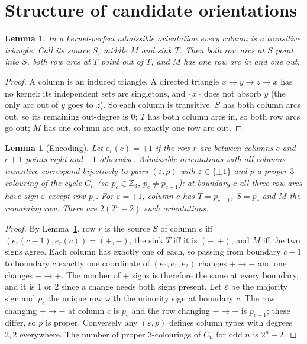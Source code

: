 \documentclass[11pt]{article}
\theoremstyle{plain}
\newtheorem{lemma}[theorem]{Lemma}
\theoremstyle{definition}
\theoremstyle{remark}
\begin{document}
\section{Structure of candidate orientations}

\begin{lemma}\label{lem:transitive}
In a kernel-perfect admissible orientation every column is a transitive triangle. Call
its source $S$, middle $M$ and sink $T$. Then both row arcs at $S$ point into $S$, both row
arcs at $T$ point out of $T$, and $M$ has one row arc in and one out.
\end{lemma}
\begin{proof}
A column is an induced triangle. A directed triangle $x\to y\to z\to x$ has no kernel:
its independent sets are singletons, and $\{x\}$ does not absorb $y$ (the only arc out
of $y$ goes to $z$). So each column is transitive. $S$ has both column arcs out, so its
remaining out-degree is $0$; $T$ has both column arcs in, so both row arcs go out; $M$
has one column arc out, so exactly one row arc out.
\end{proof}

\begin{lemma}[Encoding]\label{lem:encoding}
Let $e_r(c)=+1$ if the row-$r$ arc between columns $c$ and $c+1$ points right and $-1$
otherwise. Admissible orientations with all columns transitive correspond bijectively to
pairs $(\varepsilon,p)$ with $\varepsilon\in\{\pm1\}$ and $p$ a proper $3$-colouring of
the cycle $C_n$ (so $p_c\in\mathbb Z_3$, $p_c\ne p_{c+1}$): at boundary $c$ all three row
arcs have sign $\varepsilon$ except row $p_c$. For $\varepsilon=+1$, column $c$ has
$T=p_{c-1}$, $S=p_c$ and $M$ the remaining row. There are $2(2^n-2)$ such orientations.
\end{lemma}
\begin{proof}
By Lemma~\ref{lem:transitive}, row $r$ is the source $S$ of column $c$ iff
$(e_r(c-1),e_r(c))=(+,-)$, the sink $T$ iff it is $(-,+)$, and $M$ iff the two signs
agree. Each column has exactly one of each, so passing from boundary $c-1$ to boundary $c$
exactly one coordinate of $(e_0,e_1,e_2)$ changes $+\to-$ and one changes $-\to+$. The
number of $+$ signs is therefore the same at every boundary, and it is $1$ or $2$ since a
change needs both signs present. Let $\varepsilon$ be the majority sign and $p_c$ the
unique row with the minority sign at boundary $c$. The row changing $+\to-$ at column $c$
is $p_c$ and the row changing $-\to+$ is $p_{c-1}$; these differ, so $p$ is proper.
Conversely any $(\varepsilon,p)$ defines column types with degrees $2,2$ everywhere. The
number of proper $3$-colourings of $C_n$ for odd $n$ is $2^n-2$.
\end{proof}
\end{document}
